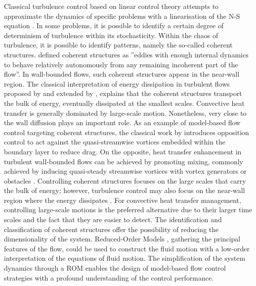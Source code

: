 Classical turbulence control based on linear control theory attempts to approximate the dynamics of specific problems with a linearisation of the N-S equation \citep{Sipp2010linearcontrol}. In some problems, it is possible to identify a certain degree of determinism of turbulence within its stochasticity. Within the chaos of turbulence, it is possible to identify patterns, namely the so-called coherent structures. \citet{jimenez2018cs} defined coherent structures as ”eddies with enough internal dynamics to behave relatively autonomously from any remaining incoherent part of the flow”. In wall-bounded flows, such coherent structures appear in the near-wall region. The classical interpretation of energy dissipation in turbulent flows proposed by \citet{Richardson1920} and extended by \citet{Kolmogorov1941}, explains that the coherent structures transport the bulk of energy, eventually dissipated at the smallest scales. Convective heat transfer is generally dominated by large-scale motion. Nonetheless, very close to the wall diffusion plays an important role. As an example of model-based flow control targeting coherent structures, the classical work by \citet{Choi1994} introduces opposition control to act against the quasi-streamwise vortices embedded within the boundary layer to reduce drag. On the opposite, heat transfer enhancement in turbulent wall-bounded flows can be achieved by promoting mixing, commonly achieved by inducing quasi-steady streamwise vortices with vortex generators or obstacles \citep{jacobi1995}.  Controlling coherent structures focuses on the large scales that carry the bulk of energy; however, turbulence control may also focus on the near-wall region where the energy dissipates \citep[see e.g.][]{Jimenez1994nwcontrol}. For convective heat transfer management, controlling large-scale motions is the preferred alternative \citep{webb2005enhanced} due to their larger time scales and the fact that they are easier to detect. The identification and classification of coherent structures offer the possibility of reducing the dimensionality of the system. Reduced-Order Models \citep[ROM,][]{noack2011ROMcontrol}, gathering the principal features of the flow, could be used to construct the fluid motion with a low-order interpretation of the equations of fluid motion. The simplification of the system dynamics through a ROM enables the design of model-based flow control \citep[see e.g.][]{Rowley2006control} strategies with a profound understanding of the control performance.

